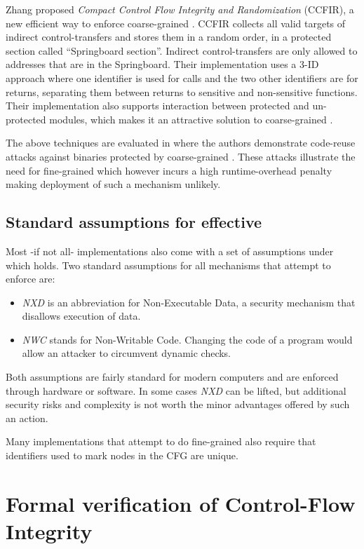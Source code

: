 Zhang \ETAL \cite{Zhang2013} proposed \emph{Compact Control Flow Integrity
and Randomization} (CCFIR), a new efficient way to enforce coarse-grained \CFI.
CCFIR collects all valid targets of indirect control-transfers and stores them
in a random order, in a protected section called ``Springboard section''. 
Indirect control-transfers are only allowed to addresses that are in the
Springboard. Their implementation uses a 3-ID approach where one identifier is
used for calls and the two other identifiers are for returns, separating them
between returns to sensitive and non-sensitive functions. Their implementation
also supports interaction between protected and un-protected modules, which
makes it an attractive solution to coarse-grained \CFI.

The above techniques are evaluated in \cite{outofcontrol_ieeesp2014} where
the authors demonstrate code-reuse attacks against binaries protected by
coarse-grained \CFI. These attacks illustrate the need for fine-grained
\CFI which however incurs a high runtime-overhead penalty making deployment
of such a mechanism unlikely.

\subsection{Standard assumptions for effective \CFI}\label{sec:cfi_assumptions}

Most -if not all- \CFI implementations also come with a set of assumptions under
which \CFI holds. Two standard assumptions for all mechanisms that attempt to
enforce \CFI are:
\begin{itemize}
\item \emph{NXD} is an abbreviation for Non-Executable Data, a security
mechanism that disallows execution of data. 
\item \emph{NWC} stands for Non-Writable Code. Changing the code of a
program would allow an attacker to circumvent dynamic checks.
\end{itemize}

Both assumptions are fairly standard for modern computers and are enforced
through hardware or software. In some cases \emph{NXD} can be lifted, but
additional security risks and complexity is not worth the minor advantages
offered by such an action.

Many implementations that attempt to do fine-grained \CFI also require that
identifiers used to mark nodes in the CFG are unique.

\section{Formal verification of Control-Flow Integrity}\label{sec:cfi_verif}

